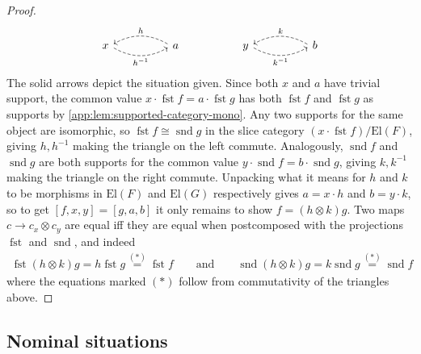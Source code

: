 \documentclass[
  sigconf,
  screen, ]{acmart}
\theoremstyle{definition}
\newcommand\nref[2]{\hyperref[#1]{#2}} \newcommand\checkhigh{{\huge{\color{red}\textbf{TODO: check}}}}
\newcommand\catelts{{\nref{def:catelts}{\mathrm{El}}}}
\newcommand\scmfst{\mathop{\nref{app:def:semicartesian-monoidal-category}{\mathrm{fst}}}}
\newcommand\scmsnd{\mathop{\nref{app:def:semicartesian-monoidal-category}{\mathrm{snd}}}}
\begin{document}
\begin{proof}
\[\begin{tikzcd}
x \arrow[rr, "h^{-1}"', dashed, bend right, shift left] &                                                                                & a \arrow[ll, "h"', dashed, bend right, shift left] &  & y \arrow[rr, "k^{-1}"', dashed, bend right, shift left] &                                                                            & b \arrow[ll, "k"', dashed, bend right, shift left]
\end{tikzcd}
    \]
  The solid arrows depict the situation given.
  Since both $x$ and $a$ have trivial support,
  the common value $x\cdot\scmfst  f = a\cdot\scmfst  g$
  has both $\scmfst  f$ and $\scmfst  g$ as supports
  by \cref{app:lem:supported-category-mono}.
  Any two supports for the same object are isomorphic, so
  $\scmfst  f \cong \scmsnd  g$ in the slice category
  $(x\cdot \scmfst  f) / \catelts(F)$,
  giving $h,h^{-1}$ making the triangle on the left commute.
  Analogously, $\scmsnd  f$ and $\scmsnd g$ are both supports
  for the common value $y\cdot \scmsnd  f = b\cdot \scmsnd  g$,
  giving $k,k^{-1}$ making the triangle on the right commute.
  Unpacking what it means for $h$ and $k$ to be morphisms
  in $\catelts(F)$ and $\catelts(G)$ respectively gives
  $a = x\cdot h$ and $b = y \cdot k$,
  so to get $[f,x,y] = [g,a,b]$ it only remains to show
  $f = (h\otimes k)g$.
  Two maps $ c\to c_x\otimes c_y$ are equal
  iff they are equal when postcomposed with the projections $\scmfst $ and $\scmsnd $,
  and indeed
  \begin{align*}
    \scmfst (h\otimes k)g = h\scmfst  g \stackrel{(*)}= \scmfst  f
    \qquad\text{and}\qquad
    \scmsnd (h\otimes k)g = k\scmsnd  g \stackrel{(*)}= \scmsnd  f
  \end{align*} 
  where the equations marked $(*)$ follow from commutativity
  of the triangles above.
\end{proof}

\subsection{Nominal situations}
\end{document}
